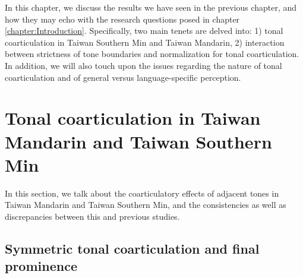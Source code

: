 \documentclass[12pt]{report}
\begin{document}
\begin{CJK}{UTF8}{bsmi}
In this chapter, we discuss the results we have seen in the previous chapter, and how they may echo with the research questions posed in chapter \ref{chapter:Introduction}. Specifically, two main tenets are delved into: 1) tonal coarticulation in Taiwan Southern Min and Taiwan Mandarin, 2) interaction between strictness of tone boundaries and normalization for tonal coarticulation. In addition, we will also touch upon the issues regarding the nature of tonal coarticulation and of general versus language-specific perception.

\section{Tonal coarticulation in Taiwan Mandarin and Taiwan Southern Min}

In this section, we talk about the coarticulatory effects of adjacent tones in Taiwan Mandarin and Taiwan Southern Min, and the consistencies as well as discrepancies between this and previous studies.

\subsection{Symmetric tonal coarticulation and final prominence}


\end{CJK}
\end{document}

